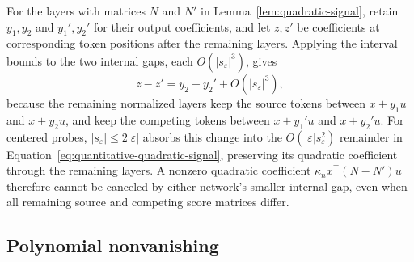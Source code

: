 \documentclass[mlmain]{jmlr}
\begin{document}
For the layers with matrices $N$ and $N'$ in
Lemma~\ref{lem:quadratic-signal}, retain $y_1,y_2$ and $y_1',y_2'$ for
their output coefficients, and let $z,z'$ be coefficients at corresponding
token positions after the remaining layers.  Applying the interval bounds
to the two internal gaps, each $O(|s_\varepsilon|^3)$, gives
\begin{equation}
 z-z'=y_2-y_2'+O(|s_\varepsilon|^3),
 \label{eq:quantitative-suffix-persistence}
\end{equation}
because the remaining normalized layers keep the source tokens between
$x+y_1u$ and $x+y_2u$, and keep the competing tokens between $x+y_1'u$ and
$x+y_2'u$.  For centered probes,
$|s_\varepsilon|\le2|\varepsilon|$ absorbs this change into the
$O(|\varepsilon|s_\varepsilon^2)$ remainder in
Equation~\eqref{eq:quantitative-quadratic-signal}, preserving its quadratic
coefficient through the remaining layers.  A nonzero quadratic coefficient
$\kappa_n x^\top(N-N')u$ therefore cannot be canceled by either network's
smaller internal gap, even when all
remaining source and competing score matrices differ.


\subsection{Polynomial nonvanishing}
\end{document}
